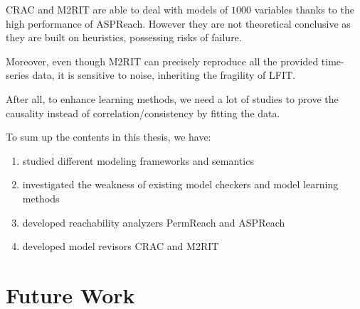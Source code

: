 CRAC and M2RIT are able to deal with models of $1000$ variables thanks to the high performance of ASPReach.
However they are not theoretical conclusive as they are built on heuristics, possessing risks of failure.

Moreover, even though M2RIT can precisely reproduce all the provided time-series data, it is sensitive to noise, inheriting the fragility of LFIT.

After all, to enhance learning methods, we need a lot of studies to prove the causality instead of correlation/consistency by fitting the data.

To sum up the contents in this thesis, we have:

\begin{enumerate}
    \item studied different modeling frameworks and semantics
    \item investigated the weakness of existing model checkers and model learning methods
    \item developed reachability analyzers PermReach and ASPReach
    \item developed model revisors CRAC and M2RIT
\end{enumerate}

\section{Future Work}

